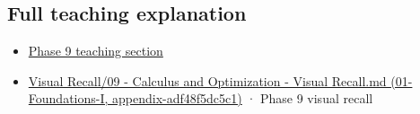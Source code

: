 \subsection{Full teaching explanation}\label{appendix-ab31ef447dbf-full-teaching-explanation}

\begin{itemize}
\tightlist
\item
  \hyperref[02-foundations-ii-ch021-jacobians-curvature-and-local-approximation]{Phase 9 teaching section}
\item
  \href{../01-Foundations-I/main.pdf\#nameddest=appendix-adf48f5dc5c1}{Visual Recall/09 - Calculus and Optimization - Visual Recall.md (01-Foundations-I, appendix-adf48f5dc5c1)} · Phase 9 visual recall
\end{itemize}
